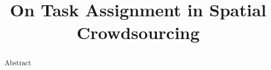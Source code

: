 \documentclass{vldb}
\title{On Task Assignment in Spatial Crowdsourcing}
\begin{document}

\maketitle
\begin{abstract}
Abstract
\end{abstract}











%





\begin{scriptsize}


\end{scriptsize}

%
\end{document}

